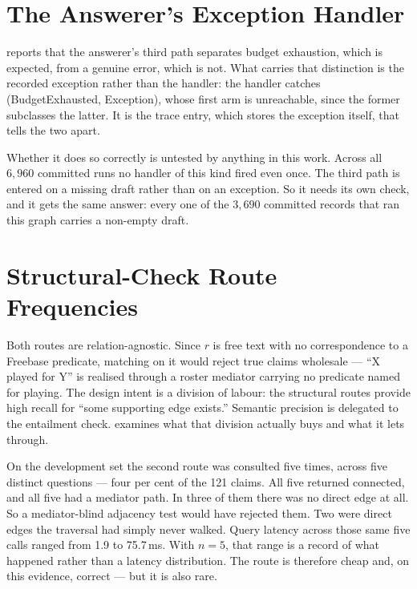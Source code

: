 \section{The Answerer's Exception Handler}\label{app:answerer-handler}

 reports that the answerer's third path separates budget
exhaustion, which is expected, from a genuine error, which is not. What carries
that distinction is the recorded exception rather than the handler: the handler
catches \textsf{(BudgetExhausted, Exception)}, whose first arm is unreachable,
since the former subclasses the latter. It is the trace entry, which stores the
exception itself, that tells the two apart.

Whether it does so correctly is untested by anything in this work. Across all
$6{,}960$ committed runs no handler of this kind fired even once. The third path
is entered on a missing draft rather than on an exception. So it needs its own
check, and it gets the same answer: every one of the $3{,}690$ committed records
that ran this graph carries a non-empty draft.


\section{Structural-Check Route Frequencies}\label{app:route-frequencies}

Both routes are relation-agnostic. Since $r$ is free text with no correspondence
to a Freebase predicate, matching on it would reject true claims wholesale ---
``X played for Y'' is realised through a roster mediator carrying no predicate
named for playing. The design intent is a division of labour: the structural
routes provide high recall for ``some supporting edge exists.'' Semantic
precision is delegated to the entailment check. 
examines what that division actually buys and what it lets through.

On the development set the second route was consulted five times, across five
distinct questions --- four per cent of the 121 claims. All five returned
connected, and all five had a mediator path. In three of them there was no
direct edge at all. So a mediator-blind adjacency test would have rejected them.
Two were direct edges the traversal had simply never walked. Query latency
across those same five calls ranged from 1.9 to 75.7\,ms. With $n = 5$, that
range is a record of what happened rather than a latency distribution. The
route is therefore cheap and, on this evidence, correct --- but it is also rare.

